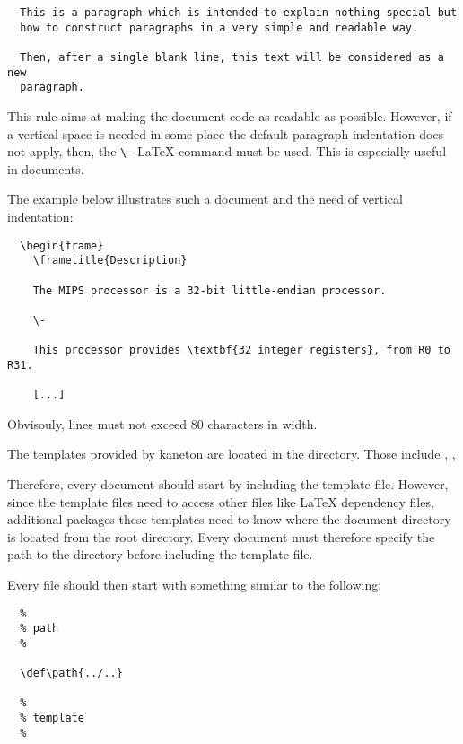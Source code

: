 \begin{verbatim}
  This is a paragraph which is intended to explain nothing special but
  how to construct paragraphs in a very simple and readable way.

  Then, after a single blank line, this text will be considered as a new
  paragraph.
\end{verbatim}

This rule aims at making the document code as readable as possible. However,
if a vertical space is needed in some place the default paragraph indentation
does not apply, then, the \verb|\-| {\LaTeX} command must be used. This is
especially useful in  documents.

The example below illustrates such a  document and the
need of vertical indentation:

\begin{verbatim}
  \begin{frame}
    \frametitle{Description}

    The MIPS processor is a 32-bit little-endian processor.

    \-

    This processor provides \textbf{32 integer registers}, from R0 to R31.

    [...]
\end{verbatim}

Obvisouly, lines must not exceed $80$ characters in width.

The templates provided by kaneton are located in the 
directory. Those include , ,  \etc{}

Therefore, every document should start by including the template file.
However, since the template files need to access other files like
{\LaTeX} dependency files, additional packages \etc{} these templates need to
know where the document directory is located from the root 
directory. Every document must therefore specify the path to the
 directory before including the template file.

Every file should then start with something similar to the following:

\begin{verbatim}
  %
  % path
  %

  \def\path{../..}

  %
  % template
  %

  
\end{verbatim}

